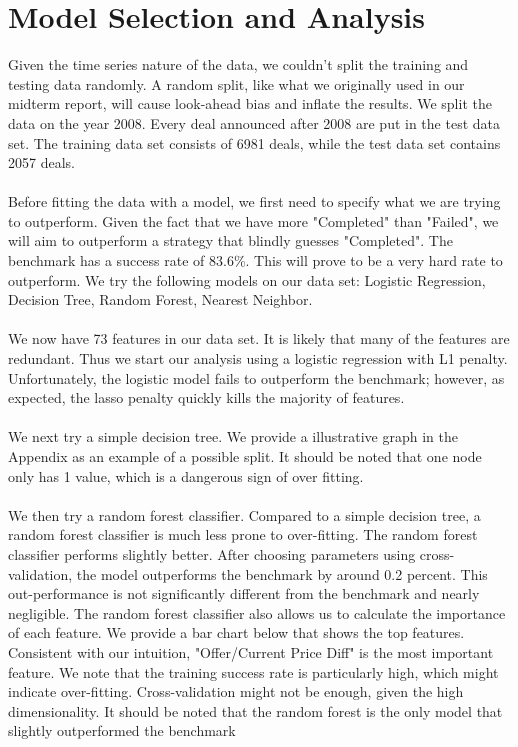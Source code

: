 \documentclass[12pt]{article}
\begin{document}
\section{Model Selection and Analysis }
\label{sec:model}

Given the time series nature of the data, we couldn't split the training and testing data  randomly. A random split, like what we originally used in our midterm report, will cause look-ahead bias and inflate the results. We split the data on the year 2008. Every deal announced after 2008 are put in the test data set. The training data set consists of 6981 deals, while the test data set contains 2057 deals.
\\
\\
Before fitting the data with a model, we first need to specify what we are trying to outperform. Given the fact that we have more "Completed" than "Failed", we will aim to outperform a strategy that blindly guesses "Completed". The benchmark has a success rate of 83.6\%. This will prove to be a very hard rate to outperform. We try the following models on our data set: Logistic Regression, Decision Tree, Random Forest, Nearest Neighbor.
\\
\\
We now have 73 features in our data set. It is likely that many of the features are redundant. Thus we start our analysis using a logistic regression with L1 penalty. Unfortunately, the logistic model fails to outperform the benchmark; however, as expected, the lasso penalty quickly kills the majority of features. 
\\
\\
We next try a simple decision tree. We provide a illustrative graph in the Appendix as an example of a possible split. It should be noted that one node only has 1 value, which is a dangerous sign of over fitting. 
\\
\\


We then try a random forest classifier. Compared to a simple decision tree, a random forest classifier is much less prone to over-fitting. The random forest classifier performs slightly better. After choosing parameters using cross-validation, the model outperforms the benchmark by around 0.2 percent. This out-performance is not significantly different from the benchmark and nearly negligible. The random forest classifier also allows us to calculate the importance of each feature. We provide a bar chart below that shows the top features. Consistent with our intuition, "Offer/Current Price Diff" is the most important feature. We note that the training success rate is particularly high, which might indicate over-fitting. Cross-validation might not be enough, given the high dimensionality. It should be noted that the random forest is the only model that slightly outperformed the benchmark
\\
\\
\end{document}
